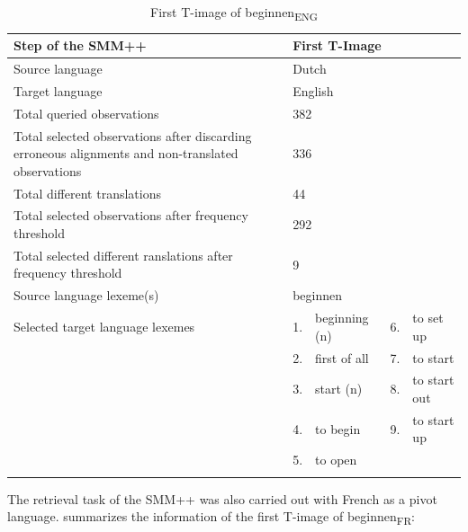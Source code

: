\begin{table}
\caption{First T-image of beginnen\textsubscript{ENG}\label{tab:3:6}}
\small
\begin{tabularx}{\textwidth}{p{}lXlX}
\lsptoprule
Step of the SMM++ & \multicolumn{4}{l}{First T-Image}\\ \midrule
\rowcolor{lsLightGray} Source language & \multicolumn{4}{l}{Dutch}\\
Target language & \multicolumn{4}{l}{English}\\
\rowcolor{lsLightGray} Total queried observations & \multicolumn{4}{l}{382}\\
Total selected observations after discarding erroneous alignments and non-translated observations &  \multicolumn{4}{l}{336}\\
\rowcolor{lsLightGray} Total different translations & \multicolumn{4}{l}{44}\\
Total selected observations after frequency threshold  & \multicolumn{4}{l}{292}\\
\rowcolor{lsLightGray} Total selected different ranslations after frequency threshold & \multicolumn{4}{l}{9}\\
Source language lexeme(s) & \multicolumn{4}{l}{beginnen}\\
\rowcolor{lsLightGray}Selected target language lexemes & 1. & beginning (n) & 6. & to set up \\
\rowcolor{lsLightGray}& 2. & first of all & 7. & to start \\
\rowcolor{lsLightGray}& 3. & start (n) & 8. & to start out \\
\rowcolor{lsLightGray}& 4. & to begin & 9. & to start up \\
\rowcolor{lsLightGray}& 5. & to open  &&\\
\lspbottomrule
\end{tabularx}
\end{table}

The retrieval task of the SMM++ was also carried out with French as a pivot language.  summarizes the information of the first T-image of beginnen\textsubscript{FR}:

